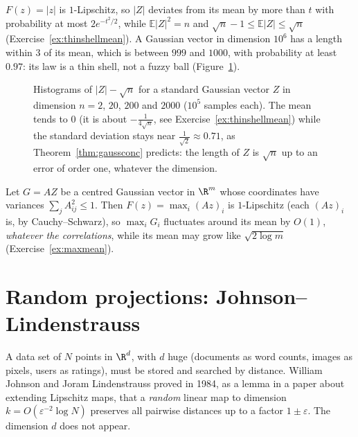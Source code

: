 \begin{example}\label{ex:thinshell}
$F(z)=|z|$ is $1$-Lipschitz, so $|Z|$ deviates from its mean by more than $t$ with probability at most $2e^{-t^2/2}$, while $\mathbb E|Z|^2=n$ and $\sqrt n-1\le\mathbb E|Z|\le\sqrt n$
(Exercise~\ref{ex:thinshellmean}). A Gaussian vector in dimension $10^6$ has a length within $3$ of its mean, which is between $999$ and $1000$, with probability at least $0.97$: its
law is a thin shell, not a fuzzy ball (Figure~\ref{fig:thinshell}).
\end{example}

\begin{figure}[ht]
\centering{}
\caption{Histograms of $|Z|-\sqrt n$ for a standard Gaussian vector $Z$ in dimension $n=2$, $20$, $200$ and $2000$ ($10^5$ samples each). The mean tends to $0$ (it is about
$-\frac1{4\sqrt n}$, see Exercise~\ref{ex:thinshellmean}) while the standard deviation stays near $\frac1{\sqrt2}\approx0.71$, as Theorem~\ref{thm:gaussconc} predicts: the
length of $Z$ is $\sqrt n$ up to an error of order one, whatever the dimension.}
\label{fig:thinshell}
\end{figure}

\begin{example}\label{ex:gaussmax}
Let $G=AZ$ be a centred Gaussian vector in $\R^m$ whose coordinates have variances $\sum_jA_{ij}^2\le1$. Then $F(z)=\max_i(Az)_i$ is $1$-Lipschitz (each $(Az)_i$ is, by
Cauchy--Schwarz), so $\max_iG_i$ fluctuates around its mean by $O(1)$, \emph{whatever the correlations}, while its mean may grow like $\sqrt{2\log m}$
(Exercise~\ref{ex:maxmean}).
\end{example}

\section{Random projections: Johnson--Lindenstrauss}

A data set of $N$ points in $\R^d$, with $d$ huge (documents as word counts, images as pixels, users as ratings), must be stored and searched by distance. William Johnson
and Joram Lindenstrauss proved in 1984, as a lemma in a paper about extending Lipschitz maps, that a \emph{random} linear map to dimension $k=O(\varepsilon^{-2}\log N)$
preserves all pairwise distances up to a factor $1\pm\varepsilon$. The dimension $d$ does not appear.

